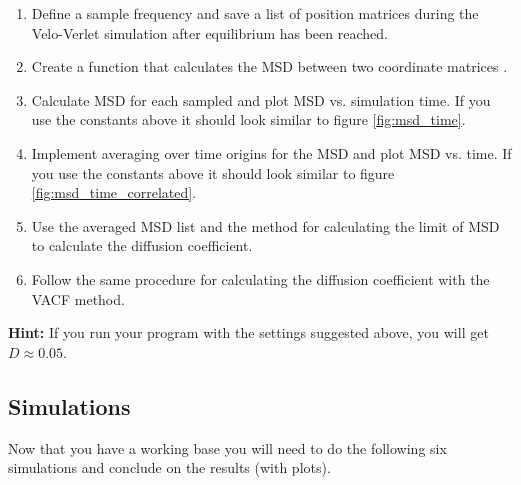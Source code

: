 \documentclass{article}
\begin{document}
\begin{enumerate}

    \item Define a sample frequency and save
    a list of position matrices  during the
    Velo-Verlet simulation after equilibrium has been reached.

    \item Create a function that calculates the MSD
    between two coordinate matrices .

    \item Calculate MSD for each sampled  and
    plot MSD vs. simulation time.
    If you use the constants above it should look similar
    to figure \ref{fig:msd_time}.

    \item Implement averaging over time origins for the MSD and plot MSD vs. time.
    If you use the constants above it should look similar
    to figure \ref{fig:msd_time_correlated}.

    \item Use the averaged MSD list and
    the method for calculating the limit of MSD
    to calculate the diffusion coefficient.

    \item Follow the same procedure for calculating
    the diffusion coefficient with the VACF method.

\end{enumerate}

\textbf{Hint:} If you run your program with the settings suggested above, you will get $D \approx 0.05$.


\clearpage
\newpage
\subsection{Simulations}

Now that you have a working base you will need to do the following six simulations and conclude on the results (with plots).
\end{document}
